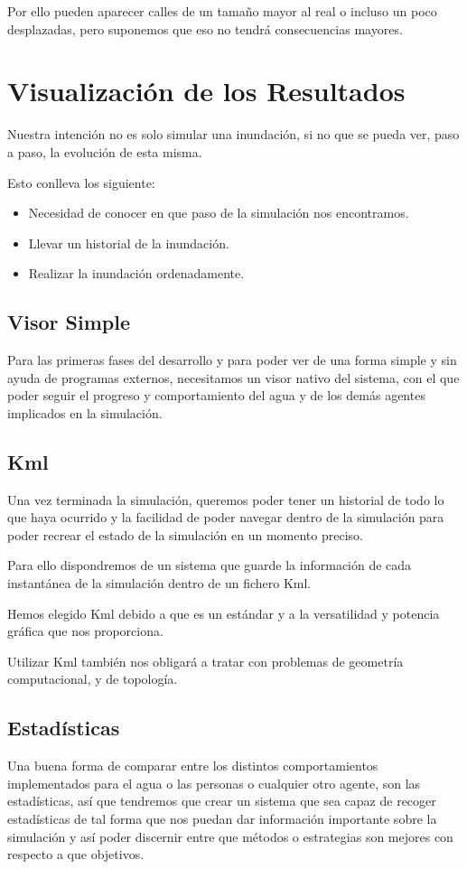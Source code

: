 Por ello pueden aparecer calles de un tamaño mayor al real o incluso un poco
desplazadas, pero suponemos que eso no tendrá consecuencias mayores.

\section*{Visualización de los Resultados}

Nuestra intención no es solo simular una inundación, si no que se pueda ver,
paso a paso, la evolución de esta misma. 

Esto conlleva los siguiente:
\begin {itemize}
\item Necesidad de conocer en que paso de la simulación nos encontramos.
\item Llevar un historial de la inundación.
\item Realizar la inundación ordenadamente.
\end {itemize}

\subsection*{Visor Simple}
Para las primeras fases del desarrollo y para poder ver de una forma simple y
sin ayuda de programas externos, necesitamos un visor nativo del sistema, con
el que poder seguir el progreso y comportamiento del agua y de los demás
agentes implicados en la simulación.
\subsection*{Kml}

Una vez terminada la simulación, queremos poder tener un historial de todo lo
que haya ocurrido y la facilidad de poder navegar dentro de la simulación para
poder recrear el estado de la simulación en un momento preciso.

Para ello dispondremos de un sistema que guarde la información de cada
instantánea de la simulación dentro de un fichero Kml.

Hemos elegido Kml debido a que es un estándar y a la versatilidad y potencia
gráfica que nos proporciona.

Utilizar Kml también nos obligará a tratar con problemas de geometría
computacional, y de topología. 

\subsection*{Estadísticas}
Una buena forma de comparar entre los distintos comportamientos implementados
para el agua o las personas o cualquier otro agente, son las estadísticas, así
que tendremos que crear un sistema que sea capaz de recoger estadísticas de tal
forma que nos puedan dar información importante sobre la simulación y así poder
discernir entre que métodos o estrategias son mejores con respecto a que
objetivos.

